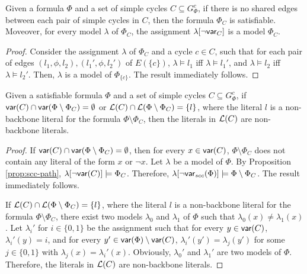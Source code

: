 \begin{proposition}\label{prop:scc-path}
Given a formula $\Phi$ and a set of simple cycles $C\subseteq G_\Phi^{c}$,
if there is no shared edges between each pair of simple cycles in $C$,
then the formula $\Phi_{C}$ is satisfiable. Moveover, for every model $\lambda$ of $\Phi_{C}$,
the assignment $\lambda[\neg \textsf{var}_{C}]$ is a model $\Phi_C$.
\end{proposition}

\begin{proof}
Consider the assignment $\lambda$ of $\Phi_{C}$ and a cycle $c\in C$, such that for each pair of edges $(l_1,\phi,l_2),(l_1',\phi,l_2')$ of $E(\{c\})$,
$\lambda\models l_1$ iff $\lambda\models l_1'$, and $\lambda\models l_2$ iff $\lambda\models l_2'$.
Then, $\lambda$ is a model of $\Phi_{\{c\}}$. The result immediately follows.
\end{proof}

\begin{lemma}
Given a satisfiable formula $\Phi$ and a set of simple cycles $C\subseteq G_\Phi^{c}$, if $\textsf{var}(C)\cap \textsf{var}(\Phi\setminus\Phi_{C})=\emptyset$ or $\Lit(C)\cap \Lit(\Phi\setminus\Phi_C)=\{l\}$, where the literal $l$ is a non-backbone literal for the formula $\Phi\setminus\Phi_C$, then the literals in $\Lit(C)$ are non-backbone literals.
\end{lemma}

\begin{proof}
If $\textsf{var}(C)\cap \textsf{var}(\Phi\setminus\Phi_{C})=\emptyset$, then for every $x\in\textsf{var}(C)$, $\Phi\setminus\Phi_C$ does not contain any
literal of the form $x$ or $\neg x$. Let $\lambda$ be a model of $\Phi$.
By Proposition \ref{prop:scc-path}, $\lambda[\neg\textsf{var}(C)]\models\Phi_C$.
Therefore, $\lambda[\neg\textsf{var}_{scc}(\Phi) ]\models\Phi\setminus\Phi_C$.
The result immediately follows.

If $\Lit(C)\cap \Lit(\Phi\setminus\Phi_C)=\{l\}$, where the literal $l$ is a non-backbone literal for the formula $\Phi\setminus\Phi_C$,
there exist two models $\lambda_0$ and $\lambda_1$ of $\Phi$ such that $\lambda_0(x)\neq \lambda_1(x)$.
Let $\lambda_i'$ for $i\in\{0,1\}$ be the assignment such that
for every $y\in\textsf{var}(C)$, $\lambda_i'(y)=i$, and for every $y'\in \textsf{var}(\Phi)\setminus\textsf{var}(C)$,
$\lambda_i'(y')=\lambda_j(y')$ for some $j\in\{0,1\}$ with $\lambda_j(x)=\lambda_i'(x)$.
Obviously, $\lambda_0'$ and $\lambda_1'$ are two models of $\Phi$. Therefore,
the literals in $\Lit(C)$ are non-backbone literals.
\end{proof}

